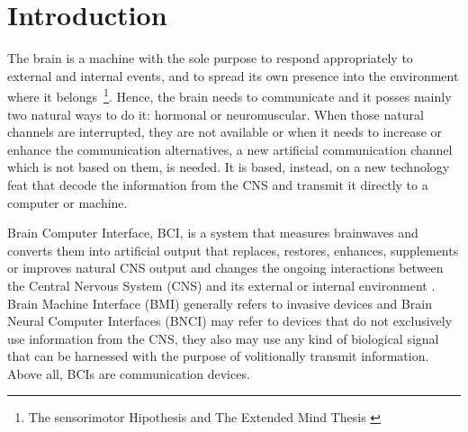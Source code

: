\chapter*{Introduction}



The brain is a machine with the sole purpose to respond appropriately to external and internal events, and to spread its own presence into the environment where it belongs~\footnote{The sensorimotor Hipothesis \cite{young1970,WolpawJonathanR2012} and The Extended Mind Thesis \cite{clark2008}}.  Hence, the brain needs to communicate and it posses mainly two natural ways to do it: hormonal or neuromuscular.  When those natural channels are interrupted, they are not available or when it needs to increase or enhance the communication alternatives, a new artificial communication channel which is not based on them, is needed. It is based, instead, on a new technology feat that decode the information from the CNS and transmit it directly to a computer or machine.

Brain Computer Interface, BCI, is a system that measures brainwaves and converts them into artificial output that replaces, restores, enhances, supplements or improves natural CNS output and changes the ongoing interactions between the Central Nervous System (CNS) and its external or internal environment \cite{WolpawJonathanR2012}. Brain Machine Interface (BMI) generally refers to invasive devices and Brain Neural Computer Interfaces (BNCI) may refer to devices that do not exclusively use information from the CNS, they also may use any kind of biological signal that can be harnessed with the purpose of volitionally transmit information. Above all, BCIs are communication devices.

